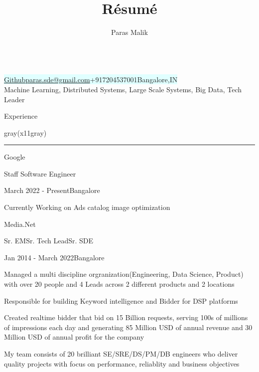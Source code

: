 \documentclass[8pt,a4paper]{article}
\makeatletter
\renewcommand{\maketitle}{
\begin{center}
{\Huge \bfseries
\theauthor} \vspace{.25em} \\
\colorbox{lightcyan}{
\href{http://github.com/i-plusplus}{Github}{\textbar}\href{mailto:paras.sde@gmail.com}{paras.sde@gmail.com}{\textbar}+917204537001{\textbar}Bangalore,IN
} 
\\
\normalsize{Machine Learning, Distributed Systems, Large Scale Systems, Big Data, Tech Leader}

\vspace{.5em}
\end{center}
}
\makeatother
\begin{document}
\title{R\'esum\'e}
\author{Paras Malik}
\maketitle
\begin{multicols}{2}
\setlength{\columnseprule}{0.4pt}
\begin{section}{Experience}
\end{section}

\begin{color}{gray(x11gray)}\hrule\end{color}
\vspace{5mm}
\begin{expsec}{Google}
\end{expsec}
\begin{expsubsec}{Staff Software Engineer}
\end{expsubsec}
\begin{timeandlocation}March 2022 - Present{\textbar}Bangalore
\end{timeandlocation}
\begin{desc}{Currently Working on Ads catalog image optimization}
\end{desc}
\begin{expsec}{Media.Net}
\end{expsec}
\begin{expsubsec}{Sr. EM{\textbar}Sr. Tech Lead{\textbar}Sr. SDE}
\end{expsubsec}
\begin{timeandlocation}Jan 2014 - March 2022{\textbar}Bangalore
\end{timeandlocation}
\begin{desc}{Managed a multi discipline orgranization(Engineering, Data Science, Product) with over 20 people and 4 Leads across 2 different products and 2 locations}
\end{desc}
\begin{desc}{Responsible for building Keyword intelligence and Bidder for DSP platforms}
\end{desc}
\begin{desc}{Created realtime bidder that bid on 15 Billion requests, serving 100s of millions of impressions each day and generating 85 Million USD of annual revenue and 30 Million USD of annual profit for the company}
\end{desc}
\begin{desc}{My team consists of 20 brilliant SE/SRE/DS/PM/DB engineers who deliver quality projects with focus on performance, reliablity and business objectives}

\end{desc}
\end{multicols}
\end{document}

